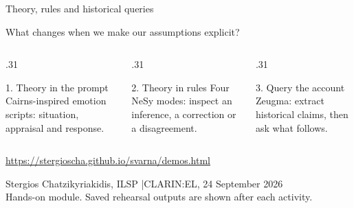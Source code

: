 \documentclass[aspectratio=169,10pt]{beamer}
\newcommand{\source}[1]{\vfill{\scriptsize\color{slate}#1\par}}
\begin{document}
\begin{frame}{Theory, rules and historical queries}
  \par
  {\LARGE What changes when we make our assumptions explicit?\par}
  \vspace{1em}
  \begin{columns}[T]
    \begin{column}{.31\textwidth}
      \begin{block}{1. Theory in the prompt}
        Cairns-inspired emotion scripts: situation, appraisal and response.
      \end{block}
    \end{column}
    \begin{column}{.31\textwidth}
      \begin{block}{2. Theory in rules}
        Four NeSy modes: inspect an inference, a correction or a disagreement.
      \end{block}
    \end{column}
    \begin{column}{.31\textwidth}
      \begin{block}{3. Query the account}
        Zeugma: extract historical claims, then ask what follows.
      \end{block}
    \end{column}
  \end{columns}
  \medskip
  \small\url{https://stergioscha.github.io/svarna/demos.html}
  \source{Stergios Chatzikyriakidis, ILSP \enspace|\enspace CLARIN:EL, 24 September 2026\\
  Hands-on module. Saved rehearsal outputs are shown after each activity.}
\end{frame}
\end{document}
